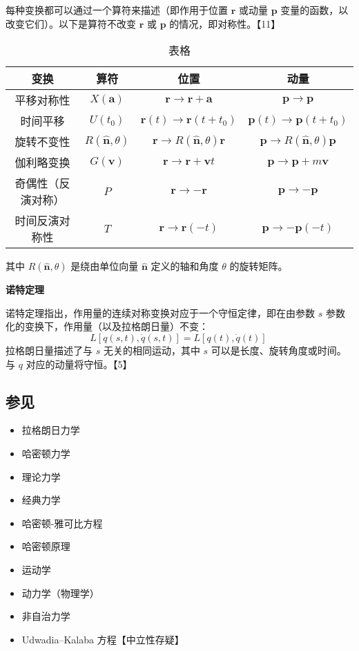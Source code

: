 每种变换都可以通过一个算符来描述（即作用于位置 \( \mathbf{r} \) 或动量 \( \mathbf{p} \) 变量的函数，以改变它们）。以下是算符不改变 \( \mathbf{r} \) 或 \( \mathbf{p} \) 的情况，即对称性。【11】
\begin{table}[ht]
\centering
\caption{表格}\label{DCX}
\begin{tabular}{|c|c|c|c|}
\hline
\textbf{变换} & \textbf{算符} & \textbf{位置} & \textbf{动量} \\
\hline
平移对称性 & \( X(\mathbf{a}) \) & \( \mathbf{r} \to \mathbf{r} + \mathbf{a} \) & \( \mathbf{p} \to \mathbf{p} \) \\
\hline
时间平移 & \( U(t_0) \) & \( \mathbf{r}(t) \to \mathbf{r}(t + t_0) \) & \( \mathbf{p}(t) \to \mathbf{p}(t + t_0) \) \\
\hline
旋转不变性 & \( R(\hat{\mathbf{n}}, \theta) \) & \( \mathbf{r} \to R(\hat{\mathbf{n}}, \theta) \mathbf{r} \) & \( \mathbf{p} \to R(\hat{\mathbf{n}}, \theta) \mathbf{p} \) \\
\hline
伽利略变换 & \( G(\mathbf{v}) \) & \( \mathbf{r} \to \mathbf{r} + \mathbf{v}t \) & \( \mathbf{p} \to \mathbf{p} + m \mathbf{v} \) \\
\hline
奇偶性（反演对称） & \( P \) & \( \mathbf{r} \to -\mathbf{r} \) & \( \mathbf{p} \to -\mathbf{p} \) \\
\hline
时间反演对称性 & \( T \) & \( \mathbf{r} \to \mathbf{r}(-t) \) & \( \mathbf{p} \to -\mathbf{p}(-t) \) \\
\hline
\end{tabular}
\end{table}
其中 \( R(\hat{\mathbf{n}}, \theta) \) 是绕由单位向量 \( \hat{\mathbf{n}} \) 定义的轴和角度 \( \theta \) 的旋转矩阵。

\textbf{诺特定理}  

诺特定理指出，作用量的连续对称变换对应于一个守恒定律，即在由参数 \( s \) 参数化的变换下，作用量（以及拉格朗日量）不变：
\[
L[q(s, t), \dot{q}(s, t)] = L[q(t), \dot{q}(t)]~
\]
拉格朗日量描述了与 \( s \) 无关的相同运动，其中 \( s \) 可以是长度、旋转角度或时间。与 \( q \) 对应的动量将守恒。【5】
\subsection{参见}  
\begin{itemize}
\item 拉格朗日力学  
\item 哈密顿力学  
\item 理论力学  
\item 经典力学  
\item 哈密顿-雅可比方程  
\item 哈密顿原理  
\item 运动学  
\item 动力学（物理学）  
\item 非自治力学  
\item Udwadia–Kalaba 方程【中立性存疑】
\end{itemize}

